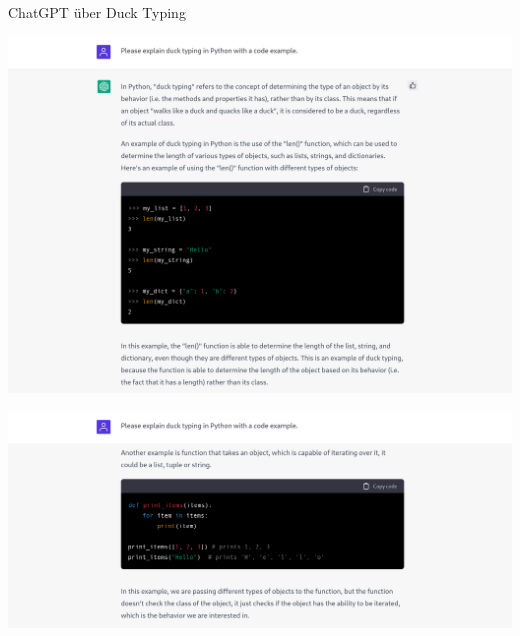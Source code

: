\begin{frame}[allowframebreaks]{ChatGPT über Duck Typing}
    \begin{center}
        \includegraphics[width=.9\textwidth]{img/chatgpt-ducktyping1}
    \end{center}

    \framebreak

    \begin{center}
        \includegraphics[width=.9\textwidth]{img/chatgpt-ducktyping2}
    \end{center}


\end{frame}

